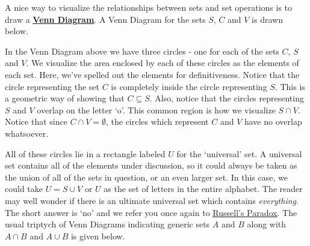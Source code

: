 \documentclass{ximera}
\begin{document}
 

A nice way to visualize the relationships between sets and set operations is to draw a  \href{http://en.wikipedia.org/wiki/Venn_diagram}{\underline{\textbf{Venn Diagram}}}.  A Venn Diagram for the sets $S$, $C$ and $V$ is drawn below.

\begin{center}

\end{center}

In the Venn Diagram above we have three circles - one for each of the sets $C$, $S$ and $V$.  We visualize the area enclosed by each of these circles as the elements of each set.  Here, we've spelled out the elements for definitiveness.  Notice that the circle representing the set $C$ is completely inside the circle representing $S$.  This is a geometric way of  showing that $C \subseteq S$.  Also, notice that the circles representing $S$ and $V$ overlap on the letter `o'.  This common region is how we visualize $S \cap V$.  Notice that since $C \cap V = \emptyset$, the circles which represent $C$ and $V$ have no overlap whatsoever. 

All of these circles lie in a rectangle labeled $U$ for the `universal' set.  A universal set contains all of the elements under discussion, so it could always be taken as the union of all of the sets in question, or an even larger set.  In this case, we could take $U = S \cup V$ or $U$ as the set of letters in the entire alphabet.  The reader may well wonder if there is an ultimate universal set which contains \textit{everything}.  The short answer is `no' and we refer you once again to \href{http://en.wikipedia.org/wiki/Russell's_paradox}{\underline{Russell's Paradox}}.  The usual triptych of Venn Diagrams indicating generic sets $A$ and  $B$ along with $A \cap B$ and $A \cup B$ is given below.
\end{document}
